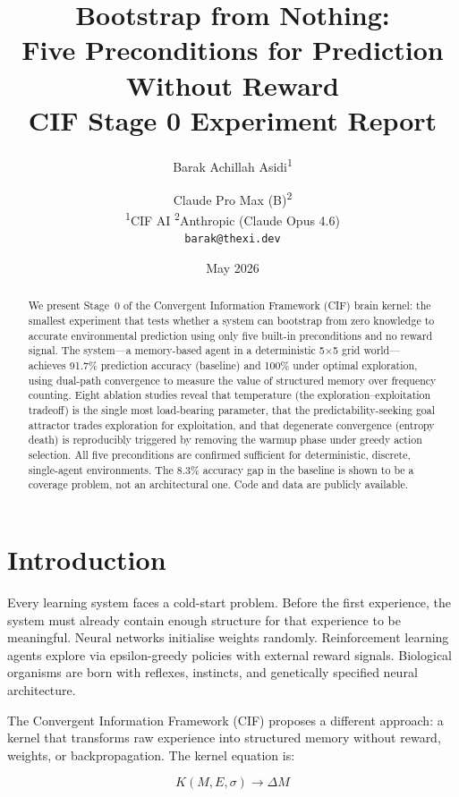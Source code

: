 \documentclass[11pt,a4paper]{article}
\title{%
    \textbf{Bootstrap from Nothing:}\\[0.3em]
    \Large Five Preconditions for Prediction Without Reward\\[0.3em]
    \large CIF Stage 0 Experiment Report
}
\author{
    Barak Achillah Asidi\textsuperscript{1} \and
    Claude Pro Max (B)\textsuperscript{2}
    \\[0.5em]
    \textsuperscript{1}CIF AI \quad
    \textsuperscript{2}Anthropic (Claude Opus 4.6)
    \\[0.3em]
    \small\texttt{barak@thexi.dev}
}
\date{May 2026}
\begin{document}
\maketitle

\begin{abstract}
We present Stage~0 of the Convergent Information Framework (CIF) brain kernel: the smallest experiment that tests whether a system can bootstrap from zero knowledge to accurate environmental prediction using only five built-in preconditions and no reward signal. The system---a memory-based agent in a deterministic 5$\times$5 grid world---achieves 91.7\% prediction accuracy (baseline) and 100\% under optimal exploration, using dual-path convergence to measure the value of structured memory over frequency counting. Eight ablation studies reveal that temperature (the exploration--exploitation tradeoff) is the single most load-bearing parameter, that the predictability-seeking goal attractor trades exploration for exploitation, and that degenerate convergence (entropy death) is reproducibly triggered by removing the warmup phase under greedy action selection. All five preconditions are confirmed sufficient for deterministic, discrete, single-agent environments. The 8.3\% accuracy gap in the baseline is shown to be a coverage problem, not an architectural one. Code and data are publicly available.
\end{abstract}

\section{Introduction}

Every learning system faces a cold-start problem. Before the first experience, the system must already contain enough structure for that experience to be meaningful. Neural networks initialise weights randomly. Reinforcement learning agents explore via epsilon-greedy policies with external reward signals. Biological organisms are born with reflexes, instincts, and genetically specified neural architecture.

The Convergent Information Framework (CIF) proposes a different approach: a kernel that transforms raw experience into structured memory without reward, weights, or backpropagation. The kernel equation is:

\begin{equation}
    K(M, E, \sigma) \rightarrow \Delta M
    \label{eq:kernel}
\end{equation}
\end{document}
